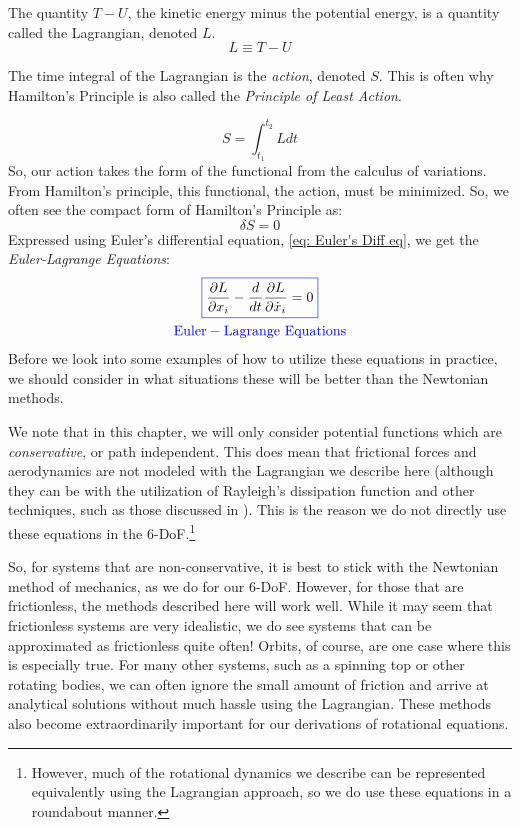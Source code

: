 \documentclass[12pt]{report}
\begin{document}
The quantity $T-U$, the kinetic energy minus the potential energy, is a quantity called the \gls{Lagrangian}, denoted $L$. 
\begin{equation}
    L\equiv T-U
\end{equation}

The time integral of the \gls{Lagrangian} is the \textit{action}, denoted $S$. This is often why Hamilton's Principle is also called the \textit{Principle of Least Action}. 

\begin{equation}
    S=\int_{t_1}^{t_2}{L}{dt}
\end{equation}
So, our action takes the form of the \gls{functional} from the calculus of variations. From Hamilton's principle, this \gls{functional}, the action, must be minimized. So, we often see the compact form of Hamilton's Principle as:
$$\delta S=0$$
Expressed using Euler's differential equation, \eqref{eq: Euler's Diff eq}, we get the \textit{Euler-Lagrange Equations}:
\begin{gather}\label{eq: Euler-Lagrange}
    \color{blue}\boxed{\color{black}\frac{\partial L}{\partial x_i}-\frac{d}{dt}\frac{\partial L}{\partial \dot{x}_i}=0}\\ \mathrm{\color{blue}Euler-Lagrange \ Equations}
\end{gather}
Before we look into some examples of how to utilize these equations in practice, we should consider in what situations these will be better than the Newtonian methods.

We note that in this chapter, we will only consider potential functions which are \textit{conservative}, or path independent. This does mean that frictional forces and aerodynamics are not modeled with the \gls{Lagrangian} we describe here (although they can be with the utilization of Rayleigh's dissipation function and other techniques, such as those discussed in \cite{rabei_hamiltonian_2004}). This is the reason we do not directly use these equations in the 6-DoF.\footnote{However, much of the rotational dynamics we describe can be represented equivalently using the \gls{Lagrangian} approach, so we do use these equations in a roundabout manner.}

So, for systems that are non-conservative, it is best to stick with the Newtonian method of mechanics, as we do for our 6-DoF. However, for those that are frictionless, the methods described here will work well. While it may seem that frictionless systems are very idealistic, we do see systems that can be approximated as frictionless quite often! Orbits, of course, are one case where this is especially true. For many other systems, such as a spinning top or other rotating bodies, we can often ignore the small amount of friction and arrive at analytical solutions without much hassle using the \gls{Lagrangian}. These methods also become extraordinarily important for our derivations of rotational equations.
\end{document}
